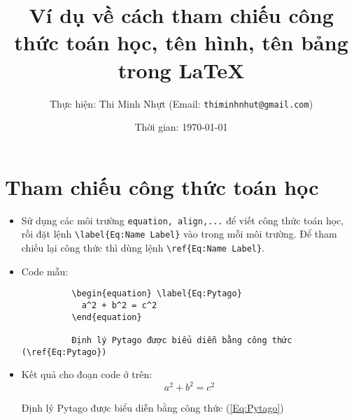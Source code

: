 \documentclass[12pt,a4paper]{article}
\title{Ví dụ về cách tham chiếu công thức toán học, tên hình, tên bảng trong \LaTeX}
\author{Thực hiện: Thi Minh Nhựt (Email: \texttt{thiminhnhut@gmail.com})}
\date{Thời gian: \today}
\begin{document}
\maketitle

\section{Tham chiếu công thức toán học}
\begin{itemize}
  \item Sử dụng các môi trường \verb|equation, align,...| để viết công thức toán học, rồi đặt lệnh \verb|\label{Eq:Name Label}| vào trong mỗi môi trường. Để tham chiếu lại công thức thì dùng lệnh \verb|\ref{Eq:Name Label}|.
  \item Code mẫu:
        \begin{verbatim}
          \begin{equation} \label{Eq:Pytago}
            a^2 + b^2 = c^2
          \end{equation}

          Định lý Pytago được biểu diễn bằng công thức (\ref{Eq:Pytago})
        \end{verbatim}
  \item Kết quả cho đoạn code ở trên:
        \begin{equation} \label{Eq:Pytago}
          a^2 + b^2 = c^2
        \end{equation}

        Định lý Pytago được biểu diễn bằng công thức (\ref{Eq:Pytago})
\end{itemize}
\end{document}
